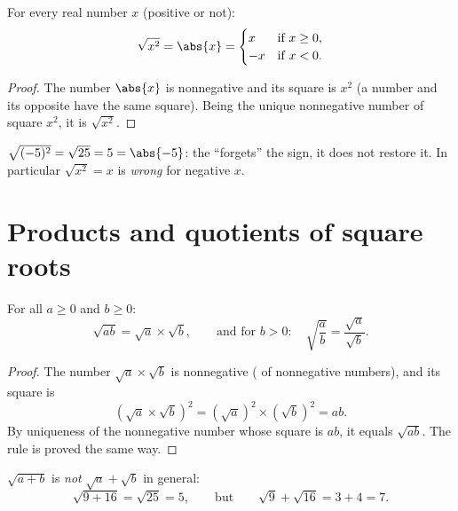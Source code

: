 \begin{proposition}\label{prop:g9:sqrt:square}
For every real number $x$ (positive or not):
\[
\sqrt{x^2} = \abs{x} =
\begin{cases}
x & \text{if } x \geq 0,\\
-x & \text{if } x < 0 .
\end{cases}
\]
\end{proposition}

\begin{proof}
The number $\abs{x}$ is nonnegative and its square is $x^2$ (a number and
its opposite have the same square). Being the unique nonnegative number
of square $x^2$, it is $\sqrt{x^2}$.
\end{proof}

\begin{example}
$\sqrt{(-5)^2} = \sqrt{25} = 5 = \abs{-5}$: the  ``forgets''
the sign, it does not restore it. In particular $\sqrt{x^2} = x$ is
\emph{wrong} for negative $x$.
\end{example}

\section{Products and quotients of square roots}

\begin{theorem}\label{thm:g9:sqrt:rules}
For all $a \geq 0$ and $b \geq 0$:
\[
\sqrt{a b} = \sqrt a \times \sqrt b,
\qquad\text{and for } b > 0:\quad
\sqrt{\frac ab} = \frac{\sqrt a}{\sqrt b} .
\]
\end{theorem}

\begin{proof}
The number $\sqrt a \times \sqrt b$ is nonnegative ( of
nonnegative numbers), and its square is
\[
\left(\sqrt a \times \sqrt b\right)^2
= \left(\sqrt a\right)^2 \times \left(\sqrt b\right)^2
= a b .
\]
By uniqueness of the nonnegative number whose square is $ab$, it equals
$\sqrt{ab}$. The  rule is proved the same way.
\end{proof}

\begin{remark}
$\sqrt{a + b}$ is \emph{not} $\sqrt a + \sqrt b$ in general:
\[
\sqrt{9 + 16} = \sqrt{25} = 5,
\qquad\text{but}\qquad
\sqrt 9 + \sqrt{16} = 3 + 4 = 7 .
\]
\end{remark}

